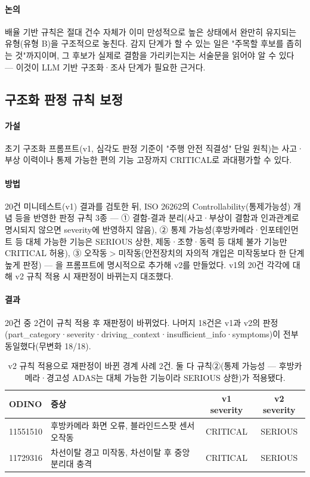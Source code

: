 \documentclass[11pt]{article}
\begin{document}
\paragraph{논의} 배율 기반 규칙은 절대 건수 자체가 이미 만성적으로 높은 상태에서 완만히 유지되는 유형(유형 B)을 구조적으로 놓친다. 감지 단계가 할 수 있는 일은 "주목할 후보를 좁히는 것"까지이며, 그 후보가 실제로 결함을 가리키는지는 서술문을 읽어야 알 수 있다 — 이것이 LLM 기반 구조화·조사 단계가 필요한 근거다.

\subsection{구조화 판정 규칙 보정}

\paragraph{가설} 초기 구조화 프롬프트(v1, 심각도 판정 기준이 "주행 안전 직결성" 단일 원칙)는 사고·부상 이력이나 통제 가능한 편의 기능 고장까지 CRITICAL로 과대평가할 수 있다.

\paragraph{방법} 20건 미니테스트(v1) 결과를 검토한 뒤, ISO 26262의 Controllability(통제가능성) 개념 등을 반영한 판정 규칙 3종 — ① 결함-결과 분리(사고·부상이 결함과 인과관계로 명시되지 않으면 severity에 반영하지 않음), ② 통제 가능성(후방카메라·인포테인먼트 등 대체 가능한 기능은 SERIOUS 상한, 제동·조향·동력 등 대체 불가 기능만 CRITICAL 허용), ③ 오작동$>$미작동(안전장치의 자의적 개입은 미작동보다 한 단계 높게 판정) — 을 프롬프트에 명시적으로 추가해 v2를 만들었다. v1의 20건 각각에 대해 v2 규칙 적용 시 재판정이 바뀌는지 대조했다.

\paragraph{결과} 20건 중 2건이 규칙 적용 후 재판정이 바뀌었다. 나머지 18건은 v1과 v2의 판정(part\_category·severity·driving\_context·insufficient\_info·symptoms)이 전부 동일했다(무변화 18/18).

\begin{table}[H]
\centering
\small
\begin{tabular}{lp{5.5cm}cc}
\toprule
ODINO & 증상 & v1 severity & v2 severity \\
\midrule
11551510 & 후방카메라 화면 오류, 블라인드스팟 센서 오작동 & CRITICAL & SERIOUS \\
11729316 & 차선이탈 경고 미작동, 차선이탈 후 중앙분리대 충격 & CRITICAL & SERIOUS \\
\bottomrule
\end{tabular}
\caption{v2 규칙 적용으로 재판정이 바뀐 경계 사례 2건. 둘 다 규칙②(통제 가능성 — 후방카메라·경고성 ADAS는 대체 가능한 기능이라 SERIOUS 상한)가 적용됐다.}
\label{tab:v1v2-boundary}
\end{table}
\end{document}
